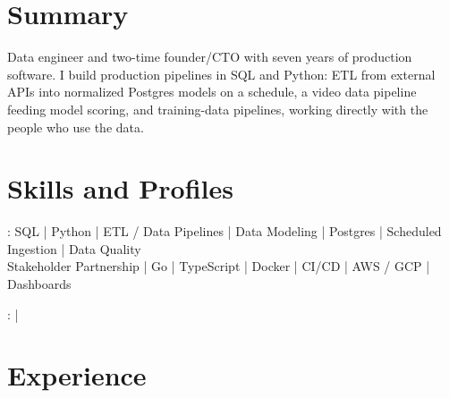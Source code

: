 \documentclass[print]{jack-resume}
\begin{document}
\pagecolor{darkmodeBackground}


\begin{minipage}[t][1cm][t]{.03\textwidth}
    \hfill
\end{minipage}

\section{Summary}
Data engineer and two-time founder/CTO with seven years of production software. I build production pipelines in SQL and Python: ETL from external APIs into normalized Postgres models on a schedule, a video data pipeline feeding model scoring, and training-data pipelines, working directly with the people who use the data.
\sectionsep

\section{Skills and Profiles}
:
SQL \hfill | \hfill
Python \hfill | \hfill
ETL / Data Pipelines \hfill | \hfill
Data Modeling \hfill | \hfill
Postgres \hfill | \hfill
Scheduled Ingestion \hfill | \hfill
Data Quality \\
\hspace{1.0cm} Stakeholder Partnership \hfill | \hfill
Go \hfill | \hfill
TypeScript \hfill | \hfill
Docker \hfill | \hfill
CI/CD \hfill | \hfill
AWS / GCP \hfill | \hfill
Dashboards \\

\raggedright{
    :
      \href{https://www.linkedin.com/in/jack-sturtevant/}{ \ExternalLink} |
     \href{https://github.com/jacksturt}{ \ExternalLink}}

\section{Experience}
\end{document}

